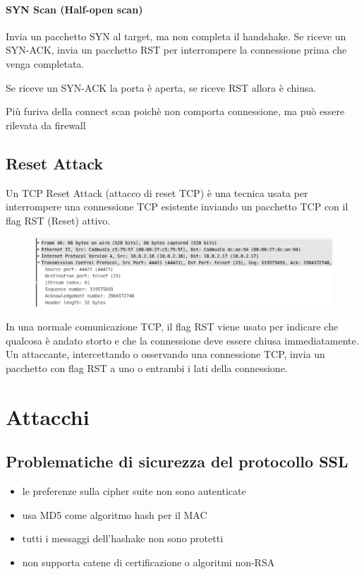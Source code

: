 \documentclass{report}
\begin{document}
\subsubsection{SYN Scan (Half-open scan)}
Invia un pacchetto SYN al target, ma non completa il handshake. Se riceve un SYN-ACK, invia un pacchetto RST per interrompere la connessione prima che venga completata.

\noindent Se riceve un SYN-ACK la porta è aperta, se riceve RST allora è chiusa.

\noindent Più furiva della connect scan poichè non comporta connessione, ma può essere rilevata da firewall 


\section{Reset Attack}
Un TCP Reset Attack (attacco di reset TCP) è una tecnica usata per interrompere una connessione TCP esistente inviando un pacchetto TCP con il flag RST (Reset) attivo.
\begin{figure}[H]
    \centering
    \includegraphics[width=1\linewidth]{images/reset.png}
\end{figure}
\noindent In una normale comunicazione TCP, il flag RST viene usato per indicare che qualcosa è andato storto e che la connessione deve essere chiusa immediatamente.
Un attaccante, intercettando o osservando una connessione TCP, invia un pacchetto con flag RST a uno o entrambi i lati della connessione.




\chapter{Attacchi}

\section{Problematiche di sicurezza del protocollo SSL}
\begin{itemize}
    \item le preferenze sulla cipher suite non sono autenticate
    \item usa MD5 come algoritmo hash per il MAC
    \item tutti i messaggi dell'hashake non sono protetti
    \item non supporta catene di certificazione o algoritmi non-RSA
\end{itemize}
\end{document}
